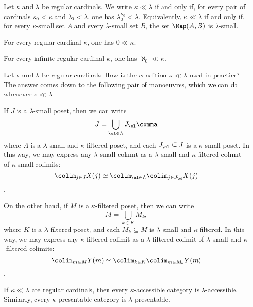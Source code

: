 \begin{definition}
	Let $ \kappa $ and $ \lambda $ be regular cardinals.
	We write $ \kappa \ll \lambda $
	if and only if,
	for every pair of cardinals
	$ \kappa_0 < \kappa $ and $ \lambda_0 < \lambda $,
	one has $ \lambda_0^{\kappa_0} < \lambda $.
	Equivalently, $ \kappa \ll \lambda $ if and only if,
	for every $ \kappa $-small set $A$
	and every $ \lambda $-small set $ B $,
	the set $ \Map(A, B) $ is $ \lambda $-small.
\end{definition}

\begin{eg}
	For every regular cardinal $ \kappa $,
	one has $ 0 \ll \kappa $.
\end{eg}

\begin{eg}
	For every infinite regular cardinal $ \kappa $,
	one has $ \aleph_0 \ll \kappa $.
\end{eg}

\begin{nul}
	Let $ \kappa $ and $ \lambda $ be regular cardinals.
	How is the condition $ \kappa \ll \lambda $ used in practice?
	The answer comes down to the following pair of manoeuvres,
	which we can do whenever $ \kappa \ll \lambda $.

	If $ J $ is a $ \lambda $-small poset,
	then we can write
	\[ J = \bigcup_{\el \in \Lambda} J_{\el} \comma \]
	where $ \Lambda $ is a $ \lambda $-small and $ \kappa $-filtered poset,
	and each $ J_{\el} \subseteq J $ is a $ \kappa $-small poset.
	In this way, we may express
	any $ \lambda $-small colimit as
	a $ \lambda $-small and $ \kappa $-filtered colimit of
	$ \kappa $-small colimits:
	\[ \colim_{j \in J} X(j) \simeq \colim_{\el \in \Lambda} \colim_{j \in J_{\el}} X(j) \]
	\citep[Corollary 4.2.3.11]{Lurie2009}.

	On the other hand, if $ M $ is a $ \kappa $-filtered poset,
	then we can write
	\[ M = \bigcup_{k \in K} M_k \comma \]
	where $ K $ is a $ \lambda $-filtered poset,
	and each $ M_k \subseteq M $ is $ \lambda $-small and $ \kappa $-filtered.
	In this way, we may express
	any $ \kappa $-filtered colimit as
	a $ \lambda $-filtered colimit of
	$ \lambda $-small and $ \kappa $-filtered colimits:
	\[ \colim_{m \in M} Y(m) \simeq \colim_{k \in K} \colim_{m \in M_k} Y(m) \]
	\citep[Lemma 5.4.2.10]{Lurie2009}.
\end{nul}

\begin{proposition}
	If $ \kappa \ll \lambda $ are regular cardinals,
	then every $ \kappa $-accessible category
	is $ \lambda $-accessible.
	Similarly, every $ \kappa $-presentable category
	is $ \lambda $-presentable.
\end{proposition}

